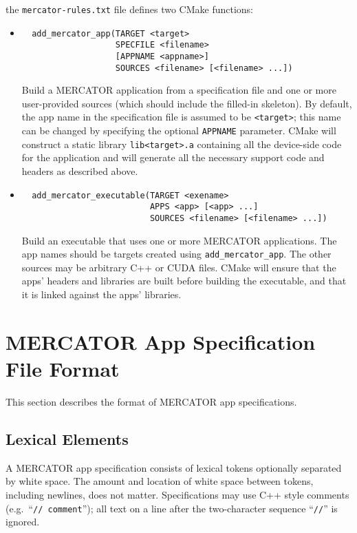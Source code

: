 \documentclass[11pt]{article}
\begin{document}
the \texttt{mercator-rules.txt} file defines two CMake functions:
\begin{itemize}

\item
\begin{verbatim}
  add_mercator_app(TARGET <target>
                   SPECFILE <filename>
                   [APPNAME <appname>]
                   SOURCES <filename> [<filename> ...])
\end{verbatim}

Build a MERCATOR application from a specification file and one or more
user-provided sources (which should include the filled-in skeleton).
By default, the app name in the specification file is assumed to be
\texttt{<target>}; this name can be changed by specifying the optional
\texttt{APPNAME} parameter. CMake will construct a static library
\texttt{lib<target>.a} containing all the device-side code for the
application and will generate all the necessary support code and
headers as described above.

\item
\begin{verbatim}
  add_mercator_executable(TARGET <exename>
                          APPS <app> [<app> ...]
                          SOURCES <filename> [<filename> ...])
\end{verbatim}

Build an executable that uses one or more MERCATOR applications.
The app names should be targets created using \texttt{add_mercator_app}.
The other sources may be arbitrary C++ or CUDA files.  CMake will
ensure that the apps' headers and libraries are built before building
the executable, and that it is linked against the apps' libraries.

\end{itemize}

\newpage

\section{MERCATOR App Specification File Format}

This section describes the format of MERCATOR app specifications.

\subsection{Lexical Elements}

A MERCATOR app specification consists of lexical tokens optionally
separated by white space. The amount and location of white space between
tokens, including newlines, does not matter.  Specifications may use
C++ style comments (e.g.\ ``\texttt{// comment}''); all text on a line
after the two-character sequence ``\texttt{//}'' is ignored.
\end{document}
